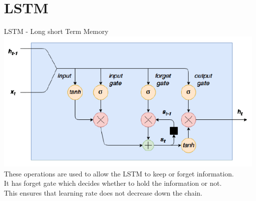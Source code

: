 \documentclass{beamer}
\theoremstyle{remark}
\numberwithin{equation}{section}
\begin{document}
\section{LSTM}
\begin{frame}{LSTM - Long short Term Memory }
\includegraphics[width=0.8\columnwidth]{./figs/LSTM.png}\\
These operations are used to allow the LSTM to keep or forget information.\\
It has forget gate which decides whether to hold the information or not.\\
This ensures that learning rate does not decrease down the chain.
\end{frame}
\end{document}
